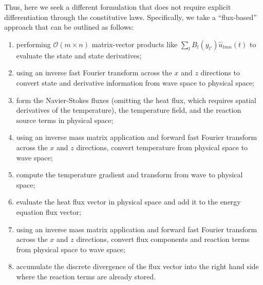 Thus, here we seek a different formulation that does not require
explicit differentiation through the constitutive laws.  Specifically,
we take a ``flux-based'' approach that can be outlined as follows:
\begin{enumerate}
\item performing $\mathcal{O}\!\left(m\times{}n\right)$ matrix-vector
  products like $\sum_{l} B_l\!\left(y_{l'}\right) \hat{u}_{l m
    n}(t)$ to evaluate the state and state derivatives;
\item using an inverse fast Fourier transform across the $x$ and $z$
  directions to convert state and derivative information from wave
  space to physical space;
\item form the Navier-Stokes fluxes (omitting the heat flux, which
  requires spatial derivatives of the temperature), the
  temperature field, and the reaction source terms in physical space;
\item using an inverse mass matrix application and forward fast
  Fourier transform across the $x$ and $z$ directions, convert
  temperature from physical space to wave space;
\item compute the temperature gradient and transform from wave to
  physical space;
\item evaluate the heat flux vector in physical space and add it to
  the energy equation flux vector;
\item using an inverse mass matrix application and forward fast
  Fourier transform across the $x$ and $z$ directions, convert flux
  components and reaction terms from physical space to wave space;
\item accumulate the discrete divergence of the flux vector into the
  right hand side where the reaction terms are already stored.
\end{enumerate}

